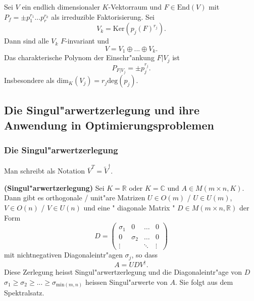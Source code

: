 \documentclass[9pt, a4paper, twocolumn, landscape]{article}
\begin{document}
{\begin{theorem}
 \end{theorem}
 
 \begin{theorem}
 Sei $V$ ein endlich dimensionaler $K$-Vektorraum und $F \in \mathrm{End}(V)$ mit $P_f = \pm p_1^{r_1} ... p_r^{r_k}$ als irreduzible Faktorisierung. Sei 
 $$
 V_k = \mathrm{Ker}(p_j(F)^{r_j}).
 $$
 Dann sind alle $V_k$ $F$-invariant und
 $$
 V = V_1 \oplus ... \oplus V_k.
 $$
 Das charakterische Polynom der Einschr"ankung $F|V_j$ ist
 $$
 P_{F|V_j} = \pm p_j^{r_j}.
 $$
 Insbesondere als $\mathrm{dim}_K(V_j) = r_j \mathrm{deg}(p_j)$.
 \end{theorem}


}


\subsection{Die Singul"arwertzerlegung und ihre Anwendung in Optimierungsproblemen}
\subsubsection{Die Singul"arwertzerlegung}

\begin{definition}
Man schreibt als Notation $\overline{V}^T = \tilde{V}^{\dagger}$.
\end{definition}

\begin{definition} \textbf{(Singul"arwertzerlegung)} Sei $K = \mathbb{R}$ oder $K = \mathbb{C}$ und $A \in M(m \times n, K)$. Dann gibt es orthogonale  / unit"are Matrizen $U \in O(m)$ / $U \in U(m)$, $V \in O(n)$ / $V \in U(n)$ und eine " diagonale Matrix  " $D\in M(m \times n, \mathbb{R})$ der Form 
$$
D=\left(\begin{array}{cccc}\sigma_{1} & 0 & \dots & 0 \\ 0 & \sigma_{2} & \dots & 0 \\ \vdots & & \ddots & \vdots\end{array}\right)
$$
mit nichtnegativen Diagonaleintr"agen $\sigma_j$, so dass
$$
A = U D V^\dagger.
$$
Diese Zerlegung heisst Singul"arwertzerlegung und die Diagonaleintr"age von $D$ $\sigma_1 \geq \sigma_2 \geq ... \geq \sigma_{\mathrm{min}(m,n)}$ heissen Singul"arwerte von $A$. Sie folgt aus dem Spektralsatz.

\end{definition}
\end{document}
